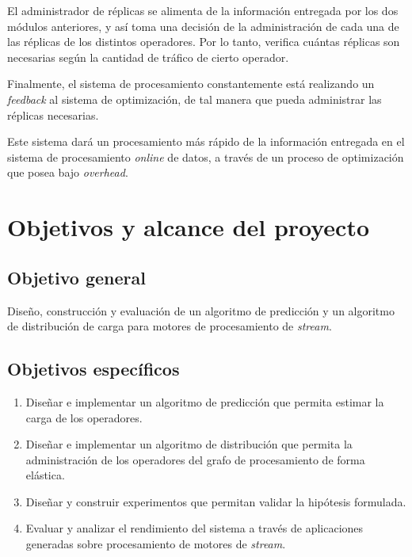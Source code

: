 El administrador de réplicas se alimenta de la información entregada por los dos módulos anteriores, y así toma una decisión de la administración de cada una de las réplicas de los distintos operadores. Por lo tanto, verifica cuántas réplicas son necesarias según la cantidad de tráfico de cierto operador.

Finalmente, el sistema de procesamiento constantemente está realizando un \textsl{feedback} al sistema de optimización, de tal manera que pueda administrar las réplicas necesarias.

Este sistema dar\'a un procesamiento más rápido de la información entregada en el sistema de procesamiento \textsl{online} de datos, a través de un proceso de optimización que posea bajo \textsl{overhead}.


\section{Objetivos y alcance del proyecto}
\label{intro:objetivos}

\subsection{Objetivo general}
	Dise\~no, construcción y evaluaci\'on de un algoritmo de predicci\'on y un algoritmo de distribuci\'on de carga para motores de procesamiento de \textsl{stream}.

\subsection{Objetivos específicos}
\begin{enumerate}
	\item Dise\~nar e implementar un algoritmo de predicci\'on que permita estimar la carga de los operadores.
	\item Dise\~nar e implementar un algoritmo de distribuci\'on que permita la administraci\'on de los operadores del grafo de procesamiento de forma el\'astica.
	\item Dise\~nar y construir experimentos que permitan validar la hip\'otesis formulada.
	\item Evaluar y analizar el rendimiento del sistema a trav\'es de aplicaciones generadas sobre procesamiento de motores de \textsl{stream}.
\end{enumerate}

